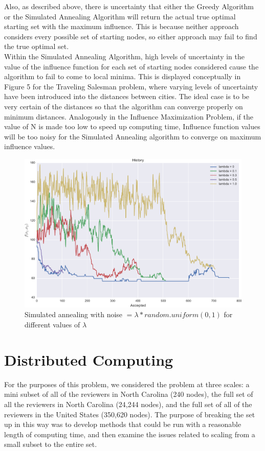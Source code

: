 \documentclass[11pt]{scrartcl} %
\begin{document}
Also, as described above, there is uncertainty that either the Greedy Algorithm or the Simulated Annealing Algorithm will return the actual true optimal starting set with the maximum influence.  This is because neither approach considers every possible set of starting nodes, so either approach may fail to find the true optimal set.  \\

Within the Simulated Annealing Algorithm, high levels of uncertainty in the value of the influence function for each set of starting nodes considered cause the algorithm to fail to come to local minima.  This is displayed conceptually in Figure 5 for the Traveling Salesman problem, where varying levels of uncertainty have been introduced into the distances between cities.  The ideal case is to be very certain of the distances so that the algorithm can converge properly on minimum distances.  Analogously in the Influence Maximization Problem, if the value of N is made too low to speed up computing time, Influence function values will be too noisy for the Simulated Annealing algorithm to converge on maximum influence values.  
	 
\begin{figure}
\centering
\includegraphics[width=10 cm]{lambda01}
\caption{Simulated annealing with noise $= \lambda*random.uniform(0,1)$ for different values of $\lambda$}
\label{fig:SA}
\end{figure}
	 
\section{Distributed Computing}

For the purposes of this problem, we considered the problem at three scales: a mini subset of all of the reviewers in North Carolina (240 nodes), the full set of all the reviewers in North Carolina (24,244 nodes), and the full set of all of the reviewers in the United States (350,620 nodes).  The purpose of breaking the set up in this way was to develop methods that could be run with a reasonable length of computing time, and then examine the issues related to scaling from a small subset to the entire set.  \\
\end{document}
